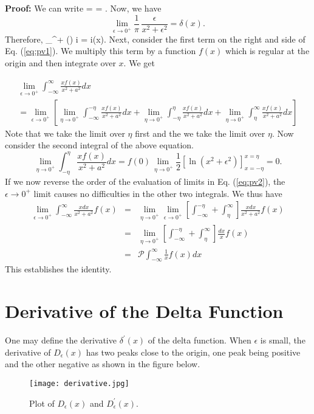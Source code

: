 \noindent
{\bf Proof:}\newline
We can write
\be
{} = =  \mp {}.
\label{eq:pv1}
\ee
Now, we have
\[ \lim_{\epsilon \rightarrow 0^+} \frac{1}{\pi}\, \frac{\epsilon}{x^2+ \epsilon^2} = \delta(x). \]
Therefore,
\be
\lim_{\epsilon {}^+} (\mp) i  = \mp i\pi \delta(x).
\ee
Next, consider the first term on the right and side of Eq. (\ref{eq:pv1}). We multiply this term by a function $f(x)$ which is regular 
at the origin and then integrate over $x$. We get

\begin{multline}
\lim_{\epsilon \rightarrow 0^+} \int_{-\infty}^{\infty}\frac{xf(x)}{x^2+a^2} dx \\
= \lim_{\epsilon \rightarrow 0^+} \left[ \lim_{\eta \rightarrow 0^+} \int_{-\infty}^{-\eta}\frac{xf(x)}{x^2+a^2} dx 
+ \lim_{\eta \rightarrow 0^+} \int_{-\eta}^{\eta}\frac{xf(x)}{x^2+a^2} dx 
+ \lim_{\eta \rightarrow 0^+} \int_{\eta}^{\infty}\frac{xf(x)}{x^2+a^2} dx \right]
\label{eq:pv2}
\end{multline}
Note that we take the limit over $\eta$ first and the we take the limit over $\eta$. Now consider the second integral of the above equation.
\[
\lim_{\eta \rightarrow 0^+} \int_{-\eta}^{\eta}\frac{xf(x)}{x^2+a^2} dx= f(0) \lim_{~\eta \rightarrow 0^+}
\frac{1}{2} \left[ \ln (x^2+ \epsilon^2) \right]_{x=-\eta}^{x=\eta} = 0.
\]
If we now reverse the order of the evaluation of limits in Eq. (\ref{eq:pv2}), the $\epsilon \rightarrow 0^+$ limit
causes no difficulties in the other two integrals. We thus have
\begin{eqnarray*}
\lim_{\epsilon \rightarrow 0^+} \int_{-\infty}^{\infty}\frac{xdx}{x^2+a^2}f(x) &=& \lim_{\eta \rightarrow 0^+}
\lim_{\epsilon \rightarrow 0^+}\left[ \int_{-\infty}^{-\eta} + \int_{\eta}^{\infty}\right] \frac{xdx}{x^2+a^2}f(x) \\
&=& \lim_{\eta \rightarrow 0^+} \left[ \int_{-\infty}^{-\eta} + \int_{\eta}^{\infty}\right] \frac{dx}{x}f(x)\\
&=& \mathcal{P}  \int_{-\infty}^{\infty} \frac{1}{x} f(x)dx
\end{eqnarray*}
This establishes the identity.


\section{Derivative of the Delta Function}
One may define the derivative $\delta^{\prime}(x)$ of the delta function. When $\epsilon$ is small, the derivative of 
$D_{\epsilon}(x)$ has two peaks close to the origin, one peak being positive and the other negative as shown in the figure
below.
\begin{figure}[ht]
\centering
\texttt{[image: derivative.jpg]}
\caption{Plot of $D_{\epsilon}(x)$ and $D^{\prime}_{\epsilon}(x)$.}
\end{figure}


